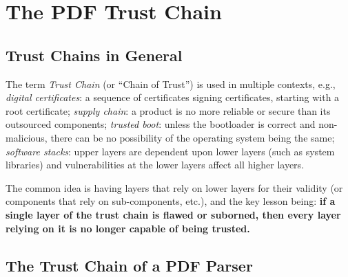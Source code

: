 \section{The PDF Trust Chain }
\label{sec:trust-chain}

\subsection{Trust Chains in General}
The term \emph{Trust Chain} (or ``Chain of Trust'') is used in multiple contexts, e.g.,
\emph{digital certificates}: a sequence of certificates signing certificates,
starting with a root certificate;
\emph{supply chain}: a product is no more reliable or secure than its
outsourced components;
\emph{trusted boot}: unless the bootloader is correct and non-malicious,
there can be no possibility of the operating system being the same;
\emph{software stacks}: upper layers are dependent upon lower layers (such as
system libraries) and vulnerabilities at the lower layers affect all higher layers.

The common idea is having layers
that rely on lower layers for their validity
(or components that rely on sub-components, etc.),
and the key lesson being:
{\bf{if a single layer of the trust chain 
  is flawed or suborned, then every layer relying on it
  is no longer capable of being trusted.}}


\subsection{The Trust Chain of a PDF Parser}


